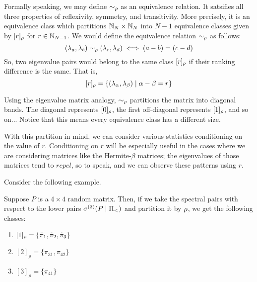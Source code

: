 \begin{remark}
Formally speaking, we may define $\sim_{\rho}$ as an equivalence relation. It satsifies all three properties of reflexivity, symmetry, and transitivity.
More precisely, it is an equivalence class which partitions $\mathbb{N}_N \times \mathbb{N}_N$ into $N - 1$ equivalence classes given by $[r]_{\rho}$ for $r \in \mathbb{N}_{N-1}$.
We would define the equivalence relation $\sim_{\rho}$ as follows:
$$(\lambda_a,\lambda_b) \sim_{\rho} (\lambda_c,\lambda_d) \iff (a -b) = (c-d)$$
So, two eigenvalue pairs would belong to the same class $[r]_{\rho}$ if their ranking difference is the same. That is,
$$[r]_{\rho} = \{(\lambda_\alpha, \lambda_\beta) \mid \alpha - \beta = r\}$$
\end{remark}

\begin{remark}
Using the eigenvalue matrix analogy, $\sim_{\rho}$ partitions the matrix into diagonal bands.
The diagonal represents $[0]_{\rho}$, the first off-diagonal represents $[1]_{\rho}$, and so on...
Notice that this means every equivalence class has a different size.
\end{remark}



\newpage

With this partition in mind, we can consider various statistics conditioning on the value of $r$.
Conditioning on $r$ will be especially useful in the cases where we are considering matrices like the Hermite-$\beta$ matrices;
the eigenvalues of those matrices tend to $\textit{repel}$, so to speak, and we can observe these patterns using $r$. \newline

\noindent Consider the following example.

\begin{example}
Suppose $P$ is a $4 \times 4$ random matrix. Then, if we take the spectral pairs with respect to the lower pairs ${\sigma^{(2)}}(P \mid \Pi_<)$ and partition it by ${\rho}$,
we get the following classes:
\begin{enumerate}
  \item $[1]_\rho = \{{\tilde{\pi}}_1, {\tilde{\pi}}_2, {\tilde{\pi}}_3\}$
  \item $[2]_\rho = \{\pi_{31}, \pi_{42}\}$
  \item $[3]_\rho = \{\pi_{41}\}$
\end{enumerate}
\end{example}

